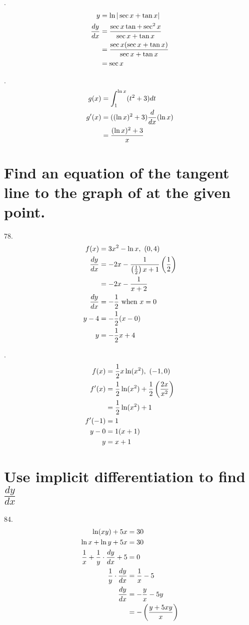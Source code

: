 \documentclass[11pt]{article}
\newcommand*{\vs}{\vspace{1cm}}
\newcommand*{\next}{\noindent}
\newcommand*{\set}{\setcounter{equation}{0}}
\newcommand*{\lt}{\left}
\newcommand*{\rt}{\right}
\begin{document}
\vs\next
72.\begin{align}
    \set
    y&=\ln|\sec x+\tan x|\\
    \frac{dy}{dx}&=\frac{\sec x\tan+\sec^2x}{\sec x+\tan x}\\
    &=\frac{\sec x(\sec x+\tan x)}{\sec x+\tan x}\\
    &=\sec x
\end{align}

\vs\next
76.\begin{align}
    \set
    g(x)&=\int_{1}^{\ln x}(t^2+3)dt\\
    g'(x)&=((\ln x)^2+3)\frac{d}{dx}(\ln x)\\
    &=\frac{(\ln x)^2+3}{x}
\end{align}

\section{Find an equation of the tangent line to
the graph of at the given point.}
78.\begin{align}
    \set
    f(x)&=3x^2-\ln x,\,\, (0, 4)\\
    \frac{dy}{dx}&=-2x-\frac{1}{\lt(\frac{1}{2}\rt)x+1}\lt(\frac{1}{2}\rt)\\
    &=-2x-\frac{1}{x+2}\\
    \frac{dy}{dx}&=-\frac{1}{2}\,\,\text{when}\,\, x=0\\
    y-4&=-\frac{1}{2}(x-0)\\
    y&=-\frac{1}{2}x+4
\end{align}

\vs\next
82.\begin{align}
    \set
    f(x)&=\frac{1}{2}x\ln(x^2),\,\, (-1, 0)\\
    f'(x)&=\frac{1}{2}\ln(x^2)+\frac{1}{2}\lt(\frac{2x}{x^2}\rt)\\
    &=\frac{1}{2}\ln(x^2)+1\\
    f'(-1)&=1\\
    y-0&=1(x+1)\\
    y&=x+1
\end{align}

\section{Use implicit differentiation to find $\frac{dy}{dx}$}
84.\begin{align}
    \set
    \ln(xy)+5x&=30\\
    \ln x+\ln y+5x&=30\\
    \frac{1}{x}+\frac{1}{y}\cdot\frac{dy}{dx}+5&=0\\
    \frac{1}{y}\cdot\frac{dy}{dx}&=\frac{1}{x}-5\\
    \frac{dy}{dx}&=-\frac{y}{x}-5y\\
    &=-\lt(\frac{y+5xy}{x}\rt)
\end{align}
\end{document}
